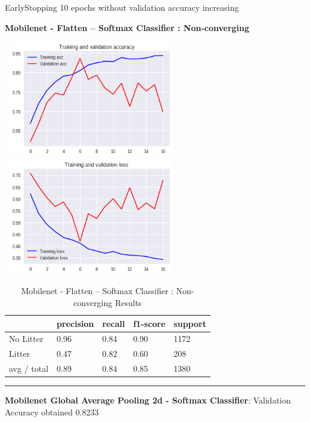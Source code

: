 \documentclass{IEEEtran}
\begin{document}
\bigskip

EarlyStopping 10 epochs without validation accuracy increasing


\bigskip

\textbf{Mobilenet - Flatten -- Softmax Classifier : Non-converging}


\bigskip


\bigskip

 \includegraphics[width=3in,height=2in]{mobilenet-img/mobilenet-img001.png} 
\includegraphics[width=3in,height=2in]{mobilenet-img/mobilenet-img002.png} 


\bigskip

\begin{table}[ht]
\centering
\caption{Mobilenet - Flatten -- Softmax Classifier : Non-converging Results}
\begin{tabular}{|l|l|l|l|l|} 
\hline
 & precision & recall  & f1-score  & support \\\hline
No Litter &
0.96 &
0.84 &
0.90 &
1172 \\\hline
Litter &
0.47 &
0.82 &
0.60 &
208 \\\hline
avg / total &
0.89 &
0.84 &
0.85 &
1380\\\hline
\end{tabular}
\end{table}

\begin{center}\noindent\rule{8cm}{0.4pt}\end{center}

\textbf{Mobilenet Global Average Pooling 2d - Softmax Classifier}: Validation Accuracy obtained 0.8233
\end{document}
